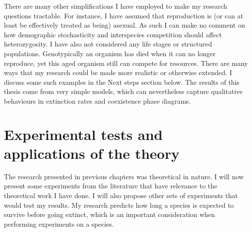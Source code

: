There are many other simplifications I have employed to make my research questions tractable. 
For instance, I have assumed that reproduction is (or can at least be effectively treated as being) asexual. 
As such I can make no comment on how demographic stochasticity and interspecies competition should affect heterozygosity. 
I have also not considered any life stages or structured populations. 
Genotypically an organism has died when it can no longer reproduce, yet this aged organism still can compete for resources. 
There are many ways that my research could be made more realistic or otherwise extended. 
I discuss some such examples in the Next steps section below. 
The results of this thesis come from very simple models, which can nevertheless capture qualitative behaviours in extinction rates and coexistence phase diagrams. 


\section{Experimental tests and applications of the theory}

The research presented in previous chapters was theoretical in nature. 
I will now present some experiments from the literature that have relevance to the theoretical work I have done. 
I will also propose other sets of experiments that would test my results. 
My research predicts how long a species is expected to survive before going extinct, which is an important consideration when performing experiments on a species. 

